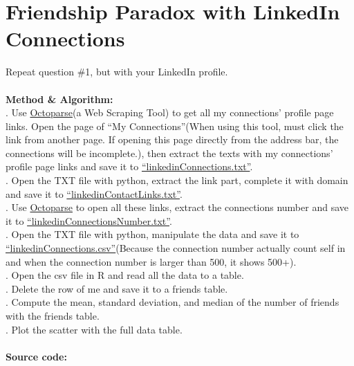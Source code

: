 \documentclass{article}
\begin{document}
		\section{Friendship Paradox with LinkedIn Connections}
		Repeat question \#1, but with your LinkedIn profile.\\\\
		\textbf{Method \& Algorithm:}\\
		. Use \href{http://www.octoparse.com/}{Octoparse}(a Web Scraping Tool) to get all my connections' profile page links. Open the page of ``My Connections''(When using this tool, must click the link from another page. If opening this page directly from the address bar, the connections will be incomplete.), then extract the texts with my connections' profile page links and save it to \href{https://github.com/zhangboroy/cs532-s17/blob/master/assg04_submission/linkedinConnections.txt}{``linkedinConnections.txt''}.\\
		. Open the TXT file with python, extract the link part, complete it with domain and save it to \href{https://github.com/zhangboroy/cs532-s17/blob/master/assg04_submission/linkedinContactLinks.txt}{``linkedinContactLinks.txt''}.\\
		. Use \href{http://www.octoparse.com/}{Octoparse} to open all these links, extract the connections number and save it to \href{https://github.com/zhangboroy/cs532-s17/blob/master/assg04_submission/linkedinConnectionsNumber.txt}{``linkedinConnectionsNumber.txt''}.\\
		. Open the TXT file with python, manipulate the data and save it to \href{https://github.com/zhangboroy/cs532-s17/blob/master/assg04_submission/linkedinConnections.csv}{``linkedinConnections.csv''}(Because the connection number actually count self in and when the connection number is larger than 500, it shows 500+).\\
		. Open the csv file in R and read all the data to a table.\\
		. Delete the row of me and save it to a friends table.\\
		. Compute the mean, standard deviation, and median of the number of friends with the friends table.\\
		. Plot the scatter with the full data table.\\\\
		\textbf{Source code:}
		
		
		
\end{document}
